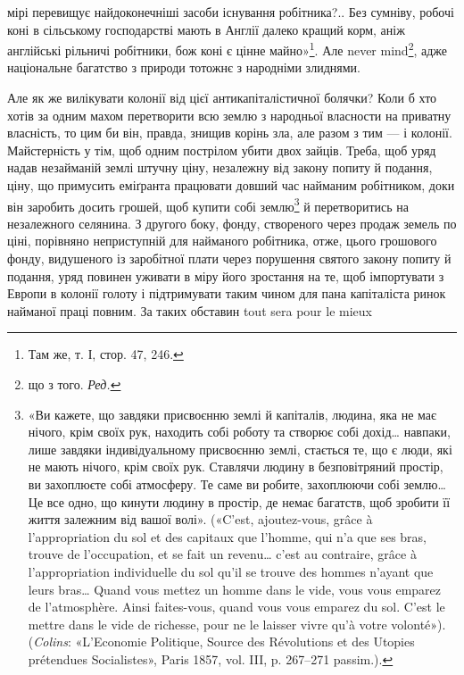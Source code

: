 \parcont{}  %
мірі перевищує найдоконечніші засоби існування робітника?.. Без сумніву, робочі коні в сільському
господарстві мають в Англії далеко кращий корм, аніж англійські рільничі робітники, бож коні є цінне
майно»\footnote{
Там же, т. І, стор. 47, 246.
}. Але never mind\footnote*{що з того. \emph{Ред.}}, адже національне багатство з природи тотожнє з народніми злиднями.

Але як же вилікувати колонії від цієї антикапіталістичної болячки? Коли б хто хотів за одним махом
перетворити всю землю з народньої власности на приватну власність, то цим би він, правда, знищив
корінь зла, але разом з тим — і колонії. Майстерність у тім, щоб одним пострілом убити двох зайців.
Треба, щоб уряд надав незайманій землі штучну ціну, незалежну від закону попиту й подання, ціну, що
примусить еміґранта
працювати довший час найманим робітником, доки він заробить досить грошей, щоб купити собі землю\footnote{
«Ви кажете, що завдяки присвоєнню землі й капіталів, людина, яка не має нічого, крім своїх рук,
находить собі роботу та створює собі дохід\dots{} навпаки, лише завдяки індивідуальному присвоєнню
землі, стається те, що є люди, які не мають нічого, крім своїх рук. Ставлячи людину в безповітряний
простір, ви захоплюєте собі атмосферу. Те саме ви робите, захоплюючи собі землю\dots{} Це все одно, що
кинути людину в простір, де немає багатств, щоб зробити її життя залежним від вашої волі». («C’est,
ajoutez-vous, grâce à l’appropriation du sol et des capitaux que l’homme, qui n’a que ses bras,
trouve de l’occupation, et se fait un revenu\dots{} c’est au contraire, grâce à l’appropriation
individuelle du
sol qu’il se trouve des hommes n’ayant que leurs bras\dots{} Quand vous mettez un homme dans le vide,
vous vous emparez de l’atmosphère. Ainsi faites-vous, quand vous vous emparez du sol. C’est le
mettre dans le vide de richesse, pour ne le laisser vivre qu’à votre volonté»). (\emph{Colins}: «L’Economie
Politique, Source des Révolutions et des Utopies prétendues Socialistes», Paris 1857, vol. III, p.
267--271 passim.).
} й перетворитись на незалежного селянина. З другого боку, фонду, створеного через продаж земель по
ціні, порівняно неприступній для найманого робітника, отже, цього грошового фонду, видушеного із
заробітної плати через порушення святого закону попиту й подання, уряд повинен уживати в міру його
зростання на те, щоб імпортувати з Европи в колонії голоту і підтримувати таким
чином для пана капіталіста ринок найманої праці повним. За таких обставин tout sera pour le mieux
